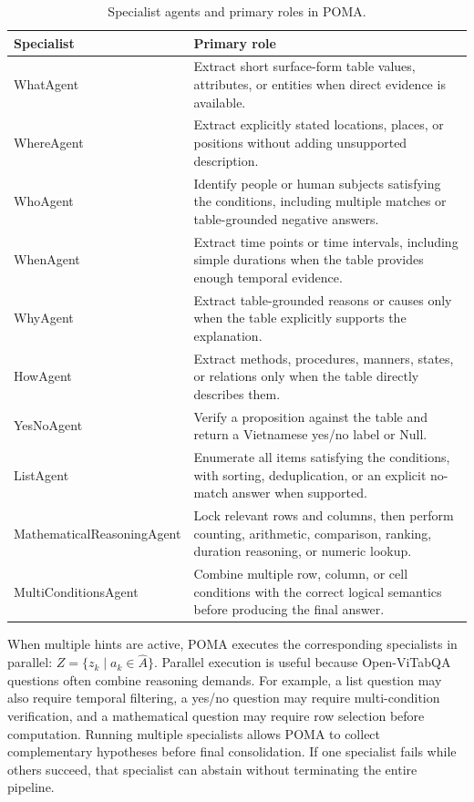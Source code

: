 \documentclass[]{interact}
\begin{document}
\begin{table}[!t]
\caption{Specialist agents and primary roles in POMA.}\label{tab:hint-specialist}
\begin{tabular*}{\textwidth}{@{\extracolsep{\fill}}p{}p{}}
\toprule
\textbf{Specialist} & \textbf{Primary role} \\
\midrule
WhatAgent & Extract short surface-form table values, attributes, or entities when direct evidence is available. \\
WhereAgent & Extract explicitly stated locations, places, or positions without adding unsupported description. \\
WhoAgent & Identify people or human subjects satisfying the conditions, including multiple matches or table-grounded negative answers. \\
WhenAgent & Extract time points or time intervals, including simple durations when the table provides enough temporal evidence. \\
WhyAgent & Extract table-grounded reasons or causes only when the table explicitly supports the explanation. \\
HowAgent & Extract methods, procedures, manners, states, or relations only when the table directly describes them. \\
YesNoAgent & Verify a proposition against the table and return a Vietnamese yes/no label or Null. \\
ListAgent & Enumerate all items satisfying the conditions, with sorting, deduplication, or an explicit no-match answer when supported. \\
MathematicalReasoningAgent & Lock relevant rows and columns, then perform counting, arithmetic, comparison, ranking, duration reasoning, or numeric lookup. \\
MultiConditionsAgent & Combine multiple row, column, or cell conditions with the correct logical semantics before producing the final answer. \\
\bottomrule
\end{tabular*}
\end{table}

When multiple hints are active, POMA executes the corresponding specialists in parallel: $Z=\{z_k\mid a_k\in\hat{A}\}$. Parallel execution is useful because Open-ViTabQA questions often combine reasoning demands. For example, a list question may also require temporal filtering, a yes/no question may require multi-condition verification, and a mathematical question may require row selection before computation. Running multiple specialists allows POMA to collect complementary hypotheses before final consolidation. If one specialist fails while others succeed, that specialist can abstain without terminating the entire pipeline.
\end{document}
